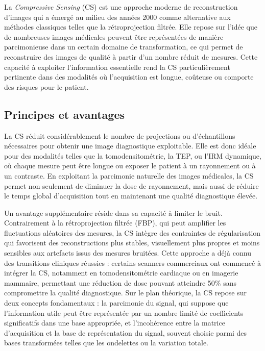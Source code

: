 La \emph{Compressive Sensing} (CS) est une approche moderne de reconstruction d'images qui a émergé au milieu des années 2000 comme alternative aux méthodes classiques telles que la rétroprojection filtrée. Elle repose sur l'idée que de nombreuses images médicales peuvent être représentées de manière parcimonieuse dans un certain domaine de transformation, ce qui permet de reconstruire des images de qualité à partir d'un nombre réduit de mesures. Cette capacité à exploiter l'information essentielle rend la CS particulièrement pertinente dans des modalités où l'acquisition est longue, coûteuse ou comporte des risques pour le patient.

\subsection{Principes et avantages}

La CS réduit considérablement le nombre de projections ou d'échantillons nécessaires pour obtenir une image diagnostique exploitable. Elle est donc idéale pour des modalités telles que la tomodensitométrie, la TEP, ou l'IRM dynamique, où chaque mesure peut être longue ou exposer le patient à un rayonnement ou à un contraste. En exploitant la parcimonie naturelle des images médicales, la CS permet non seulement de diminuer la dose de rayonnement, mais aussi de réduire le temps global d'acquisition tout en maintenant une qualité diagnostique élevée.

Un avantage supplémentaire réside dans sa capacité à limiter le bruit. Contrairement à la rétroprojection filtrée (FBP), qui peut amplifier les fluctuations aléatoires des mesures, la CS intègre des contraintes de régularisation qui favorisent des reconstructions plus stables, visuellement plus propres et moins sensibles aux artefacts issus des mesures bruitées. Cette approche a déjà connu des transitions cliniques réussies : certains scanners commerciaux ont commencé à intégrer la CS, notamment en tomodensitométrie cardiaque ou en imagerie mammaire, permettant une réduction de dose pouvant atteindre 50\% sans compromettre la qualité diagnostique. Sur le plan théorique, la CS repose sur deux concepts fondamentaux : la parcimonie du signal, qui suppose que l'information utile peut être représentée par un nombre limité de coefficients significatifs dans une base appropriée, et l'incohérence entre la matrice d'acquisition et la base de représentation du signal, souvent choisie parmi des bases transformées telles que les ondelettes ou la variation totale.

